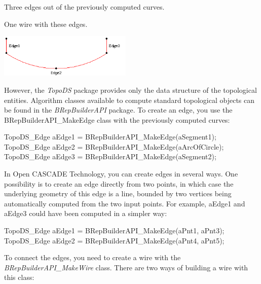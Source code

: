 \begin{DoxyItemize}
\item Three edges out of the previously computed curves.
\item One wire with these edges.
\end{DoxyItemize}


\begin{DoxyImageNoCaption}
\begin{center}
   \mbox{\includegraphics[width=240]{tutorial_image005.png}}
\end{center}
\end{DoxyImageNoCaption}


However, the {\itshape Topo\+DS} package provides only the data structure of the topological entities. Algorithm classes available to compute standard topological objects can be found in the {\itshape B\+Rep\+Builder\+A\+PI} package. To create an edge, you use the B\+Rep\+Builder\+A\+P\+I\+\_\+\+Make\+Edge class with the previously computed curves\+:


\begin{DoxyCode}
TopoDS\_Edge aEdge1 = BRepBuilderAPI\_MakeEdge(aSegment1);
TopoDS\_Edge aEdge2 = BRepBuilderAPI\_MakeEdge(aArcOfCircle);
TopoDS\_Edge aEdge3 = BRepBuilderAPI\_MakeEdge(aSegment2);
\end{DoxyCode}


In Open C\+A\+S\+C\+A\+DE Technology, you can create edges in several ways. One possibility is to create an edge directly from two points, in which case the underlying geometry of this edge is a line, bounded by two vertices being automatically computed from the two input points. For example, a\+Edge1 and a\+Edge3 could have been computed in a simpler way\+:


\begin{DoxyCode}
TopoDS\_Edge aEdge1 = BRepBuilderAPI\_MakeEdge(aPnt1, aPnt3);
TopoDS\_Edge aEdge2 = BRepBuilderAPI\_MakeEdge(aPnt4, aPnt5);
\end{DoxyCode}


To connect the edges, you need to create a wire with the {\itshape B\+Rep\+Builder\+A\+P\+I\+\_\+\+Make\+Wire} class. There are two ways of building a wire with this class\+:


